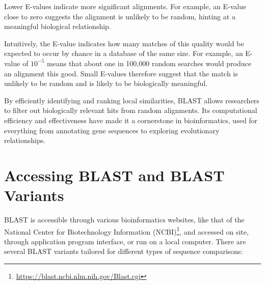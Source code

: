 \begin{enumerate}
    Lower E-values indicate more significant alignments. For example, an E-value close to zero suggests the alignment is unlikely to be random, hinting at a meaningful biological relationship.
\end{enumerate}

Intuitively, the E-value indicates how many matches of this quality would be expected to occur by chance in a database of the same size. For example, an E-value of \(10^{-5}\) means that about one in 100{,}000 random searches would produce an alignment this good. Small E-values therefore suggest that the match is unlikely to be random and is likely to be biologically meaningful.

By efficiently identifying and ranking local similarities, BLAST allows researchers to filter out biologically relevant hits from random alignments. Its computational efficiency and effectiveness have made it a cornerstone in bioinformatics, used for everything from annotating gene sequences to exploring evolutionary relationships.

\section{Accessing BLAST and BLAST Variants}

BLAST is accessible through various bioinformatics websites, like that of the National Center for Biotechnology Information (NCBI)\footnote{\url{https://blast.ncbi.nlm.nih.gov/Blast.cgi}}, and accessed on site, through application program interface, or run on a local computer. There are several BLAST variants tailored for different types of sequence comparisons:

